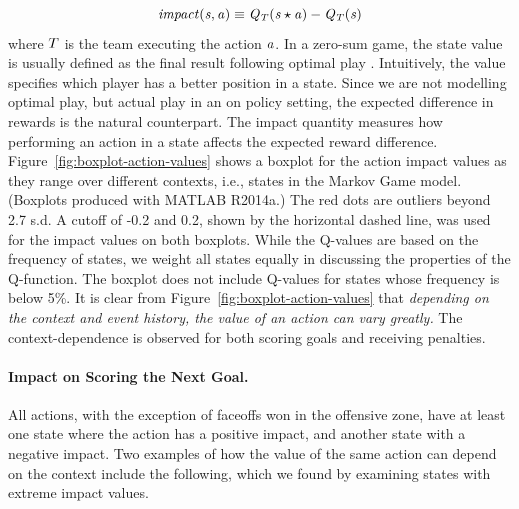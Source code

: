 \documentclass[]{article}
\begin{document}
\begin{equation*}
\it{impact}(s,a) \equiv Q_{T}(s \star a) - Q_{T}(s)
\end{equation*}
where $T$ is the team executing the action $a$. In a zero-sum game, the state value is usually defined as the final result following optimal play \citep{Russell2010}. Intuitively, the value specifies which player has a better position in a state. Since we are not modelling optimal play, but actual play in an on policy setting, the expected difference in rewards is the natural counterpart. The impact quantity measures how performing an action in a state affects the expected reward difference.
Figure~\ref{fig:boxplot-action-values} shows a boxplot for the action impact values as they range over different contexts, i.e., states in the Markov Game model.
(Boxplots produced with MATLAB R2014a.)
The red dots are outliers beyond 2.7 s.d.
A cutoff of -0.2 and 0.2, shown by the horizontal dashed line, was used for the impact values on both boxplots.
While the Q-values are based on the frequency of states, we weight all states equally in discussing the properties of the Q-function. The boxplot does not include Q-values for states whose frequency is below 5\%.
It is clear from Figure~\ref{fig:boxplot-action-values} that {\em depending on the context and event history, the value of an action can vary greatly.} The context-dependence is observed for both scoring goals and receiving penalties.

\paragraph{Impact on Scoring the Next Goal.} All actions, with the exception of faceoffs won in the offensive zone, have at least one state where the action has a positive impact, and another state with a negative impact. Two examples of how the value of the same action can depend on the context include the following, which we found by examining states with extreme impact values.
\end{document}
